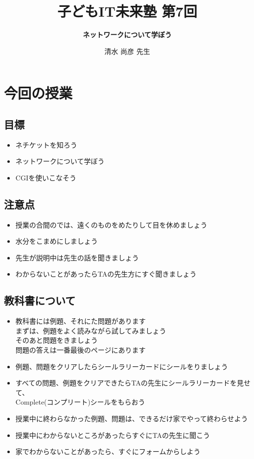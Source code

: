 \documentclass[a4paper,12pt,dvipdfmx]{jarticle}
\title{\vspace{70mm}\Huge 子どもIT未来塾 第7回}
\author{
\huge\bf ネットワークについて学ぼう
\vspace{15mm}
}
\date{%
\Huge 清水 尚彦 先生
}
\begin{document}


\maketitle

\thispagestyle{FirstPage}
\clearpage\section{今回の授業}

\subsection*{目標}
\begin{itemize}
	\item ネチケットを知ろう
	\item ネットワークについて学ぼう
	\item CGIを使いこなそう
\end{itemize}

\subsection*{注意点}
\begin{itemize}
	\item 授業の合間のでは、遠くのものをめたりして目を休めましょう
	\item 水分をこまめにしましょう
	\item 先生が説明中は先生の話を聞きましょう
	\item わからないことがあったらTAの先生方にすぐ聞きましょう
\end{itemize}

\subsection*{教科書について}
\begin{itemize}

	\item 教科書には例題、それにた問題があります\\
	      まずは、例題をよく読みながら試してみましょう\\
	      そのあと問題をきましょう\\
	      問題の答えは一番最後のページにあります
	\item 例題、問題をクリアしたらシールラリーカードにシールをりましょう

	\item すべての問題、例題をクリアできたらTAの先生にシールラリーカードを見せて、\\
	      Complete(コンプリート)シールをもらおう
	\item 授業中に終わらなかった例題、問題は、できるだけ家でやって終わらせよう
	\item 授業中にわからないところがあったらすぐにTAの先生に聞こう

	\item 家でわからないことがあったら、すぐにフォームからしよう
\end{itemize}
\end{document}
